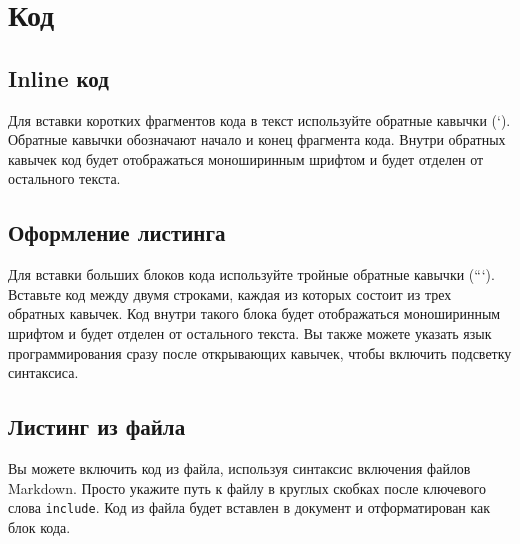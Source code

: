 \documentclass[a4paper]{article}
\newcommand{\passthrough}[1]{{\codefont #1}}
\begin{document}
\section{Код}\label{ux43aux43eux434}

\subsection{Inline код}\label{inline-ux43aux43eux434}

Для вставки коротких фрагментов кода в текст используйте обратные
кавычки (`). Обратные кавычки обозначают начало и конец фрагмента кода.
Внутри обратных кавычек код будет отображаться моноширинным шрифтом и
будет отделен от остального текста.

\subsection{Оформление
листинга}\label{ux43eux444ux43eux440ux43cux43bux435ux43dux438ux435-ux43bux438ux441ux442ux438ux43dux433ux430}

Для вставки больших блоков кода используйте тройные обратные кавычки
(```). Вставьте код между двумя строками, каждая из которых состоит из
трех обратных кавычек. Код внутри такого блока будет отображаться
моноширинным шрифтом и будет отделен от остального текста. Вы также
можете указать язык программирования сразу после открывающих кавычек,
чтобы включить подсветку синтаксиса.

\subsection{Листинг из
файла}\label{ux43bux438ux441ux442ux438ux43dux433-ux438ux437-ux444ux430ux439ux43bux430}

Вы можете включить код из файла, используя синтаксис включения файлов
Markdown. Просто укажите путь к файлу в круглых скобках после ключевого
слова \passthrough{\lstinline!include!}. Код из файла будет вставлен в
документ и отформатирован как блок кода.
\end{document}
